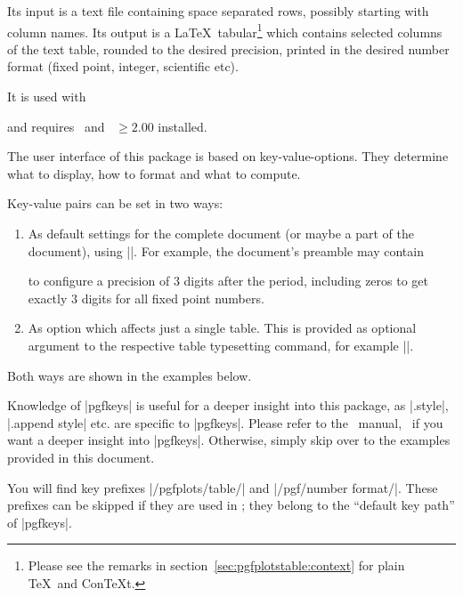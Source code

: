 Its input is a text file containing space separated rows, possibly starting with column names. Its output is a \LaTeX\ tabular\footnote{Please see the remarks in section~\ref{sec:pgfplotstable:context} for plain \TeX\ and Con\TeX t.} which contains selected columns of the text table, rounded to the desired precision, printed in the desired number format (fixed point, integer, scientific etc).

It is used with
\begin{codeexample}
\usepackage{pgfplotstable}
\end{codeexample}
\noindent and requires \PGFPlots\ and \PGF\ $ \ge 2.00$ installed.

\begin{command}{\pgfplotstableset{}}
	The user interface of this package is based on key-value-options. They determine what to display, how to format and what to compute.
	
	Key-value pairs can be set in two ways:
	\begin{enumerate}
		\item As default settings for the complete document (or maybe a part of the document), using |\pgfplotstableset|. For example, the document's preamble may contain
\begin{codeexample}
\end{codeexample}
			to configure a precision of $3$ digits after the period, including zeros to get exactly $3$ digits for all fixed point numbers.
		\item As option which affects just a single table. This is provided as optional argument to the respective table typesetting command, for example |\pgfplotstabletypesetfile|.
	\end{enumerate}
	Both ways are shown in the examples below.

	Knowledge of |pgfkeys| is useful for a deeper insight into this package, as |.style|, |.append style| etc. are specific to |pgfkeys|. Please refer to the \PGF\ manual,~\cite[section pgfkeys]{tikz} if you want a deeper insight into  |pgfkeys|. Otherwise, simply skip over to the examples provided in this document.

	You will find key prefixes |/pgfplots/table/| and |/pgf/number format/|. These prefixes can be skipped if they are used in \PGFPlotstable; they belong to the ``default key path'' of |pgfkeys|.
\end{command}

